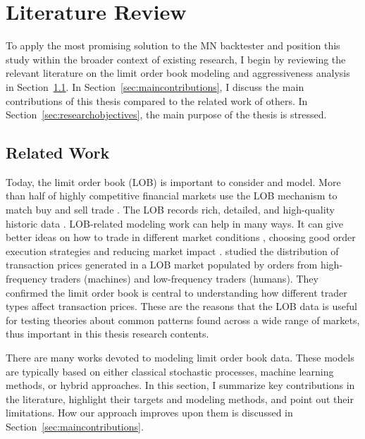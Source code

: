 \chapter{Literature Review} \label{chapter:literature}
To apply the most promising solution to the MN backtester and position this study within the broader context of existing research, I begin by reviewing the relevant literature on the limit order book modeling and aggressiveness analysis in Section~\ref{sec:relatedwork}. In Section~\ref{sec:maincontributions}, I discuss the main contributions of this thesis compared to the related work of others. In Section~\ref{sec:researchobjectives}, the main purpose of the thesis is stressed.                                                                                  
\section{Related Work} \label{sec:relatedwork}
Today, the limit order book (LOB) is important to consider and model. More than half of highly competitive financial markets use the LOB mechanism to match buy and sell trade \citep{lob2009}. The LOB records rich, detailed, and high-quality historic data \citep{gould_limit_2013}. LOB-related modeling work can help in many ways. It can give better ideas on how to trade in different market conditions \citep{SuperDOT1996}, choosing good order execution strategies \citep{OBIZHAEVA20131} and reducing market impact \citep{Eisler01092012}. \cite{cvitanic_high_nodate} studied the distribution of transaction prices generated in a LOB market populated by orders from high-frequency traders (machines) and low-frequency traders (humans). They confirmed the limit order book is central to understanding how different trader types affect transaction prices. These are the reasons that the LOB data is useful for testing theories about common patterns found across a wide range of markets, thus important in this thesis research contents. 

There are many works devoted to modeling limit order book data. These models are typically based on either classical stochastic processes, machine learning methods, or hybrid approaches. In this section, I summarize key contributions in the literature, highlight their targets and modeling methods, and point out their limitations. How our approach improves upon them is discussed in Section~\ref{sec:maincontributions}.

